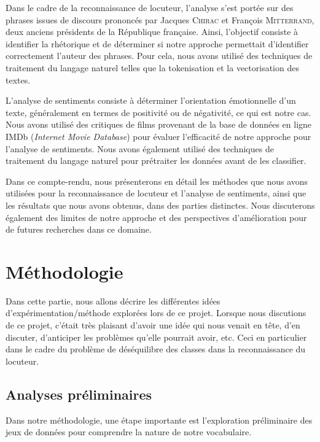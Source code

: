 \documentclass{article}
\begin{document}
Dans le cadre de la reconnaissance de locuteur, l'analyse s'est portée sur des phrases issues de discours prononcés par Jacques \textsc{Chirac} et François \textsc{Mitterrand}, deux anciens présidents de la République française. Ainsi, l'objectif consiste à identifier la rhétorique et de déterminer si notre approche permettait d'identifier correctement l'auteur des phrases. Pour cela, nous avons utilisé des techniques de traitement du langage naturel telles que la tokenisation et la vectorisation des textes.

L'analyse de sentiments consiste à déterminer l'orientation émotionnelle d'un texte, généralement en termes de positivité ou de négativité, ce qui est notre cas. Nous avons utilisé des critiques de films provenant de la base de données en ligne IMDb (\textit{Internet Movie Database}) pour évaluer l'efficacité de notre approche pour l'analyse de sentiments. Nous avons également utilisé des techniques de traitement du langage naturel pour prétraiter les données avant de les classifier.

Dans ce compte-rendu, nous présenterons en détail les méthodes que nous avons utilisées pour la reconnaissance de locuteur et l'analyse de sentiments, ainsi que les résultats que nous avons obtenus, dans des parties distinctes. Nous discuterons également des limites de notre approche et des perspectives d'amélioration pour de futures recherches dans ce domaine.

\section{Méthodologie}
Dans cette partie, nous allons décrire les différentes idées d'expérimentation/méthode explorées lors de ce projet. Lorsque nous discutions de ce projet, c'était très plaisant d'avoir une idée qui nous venait en tête, d'en discuter, d'anticiper les problèmes qu'elle pourrait avoir, etc. Ceci en particulier dans le cadre du problème de déséquilibre des classes dans la reconnaissance du locuteur.

\subsection{Analyses préliminaires}

Dans notre méthodologie, une étape importante est l'exploration préliminaire des jeux de données pour comprendre la nature de notre vocabulaire.
\end{document}
